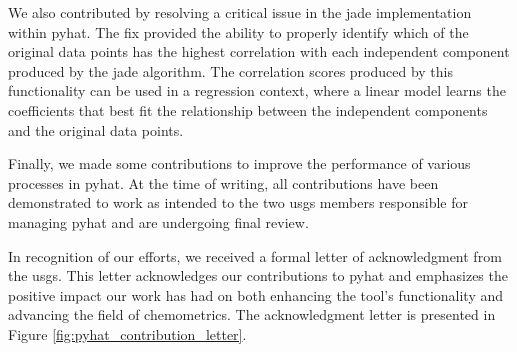 We also contributed by resolving a critical issue in the \gls{jade} implementation within \gls{pyhat}.
The fix provided the ability to properly identify which of the original data points has the highest correlation with each independent component produced by the \gls{jade} algorithm.
The correlation scores produced by this functionality can be used in a regression context, where a linear model learns the coefficients that best fit the relationship between the independent components and the original data points.

Finally, we made some contributions to improve the performance of various processes in \gls{pyhat}.
At the time of writing, all contributions have been demonstrated to work as intended to the two \gls{usgs} members responsible for managing \gls{pyhat} and are undergoing final review.

In recognition of our efforts, we received a formal letter of acknowledgment from the \gls{usgs}.
This letter acknowledges our contributions to \gls{pyhat} and emphasizes the positive impact our work has had on both enhancing the tool's functionality and advancing the field of chemometrics.
The acknowledgment letter is presented in Figure \ref{fig:pyhat_contribution_letter}.